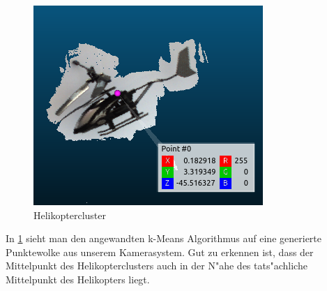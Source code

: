 \begin{figure}[H]
	\includegraphics[scale=0.75]{bilder/helicloud}
	\caption[Helikoptercluster]{Helikoptercluster}
	\label{fig:helimeans}%
\end{figure}

\noindent In \ref{fig:helimeans} sieht man den angewandten k-Means Algorithmus auf eine generierte Punktewolke aus unserem Kamerasystem. Gut zu erkennen ist, dass der Mittelpunkt des Helikopterclusters auch in der N"ahe des tats"achliche Mittelpunkt des Helikopters liegt.
